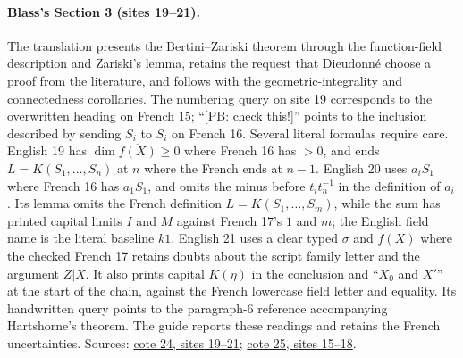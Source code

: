 \documentclass[10pt,a4paper]{article}
\begin{document}
\paragraph{Blass's Section 3 (sites 19--21).}
The translation presents the Bertini--Zariski theorem through the function-field description and Zariski's lemma, retains the request that Dieudonné choose a proof from the literature, and follows with the geometric-integrality and connectedness corollaries. The numbering query on site 19 corresponds to the overwritten heading on French 15; ``[PB: check this!]'' points to the inclusion described by sending $S_i$ to $S_i$ on French 16. Several literal formulas require care. English 19 has $\dim\overline{f(X)}\geq0$ where French 16 has $>0$, and ends $L=K(S_1,\ldots,S_n)$ at $n$ where the French ends at $n-1$. English 20 uses $a_iS_1$ where French 16 has $a_1S_1$, and omits the minus before $t_it_n^{-1}$ in the definition of $a_i$. Its lemma omits the French definition $L=K(S_1,\ldots,S_m)$, while the sum has printed capital limits $I$ and $M$ against French 17's $1$ and $m$; the English field name is the literal baseline $k1$. English 21 uses a clear typed $\sigma$ and $f(X)$ where the checked French 17 retains doubts about the script family letter and the argument $Z|X$. It also prints capital $K(\eta)$ in the conclusion and ``$X_0$ and $X'$'' at the start of the chain, against the French lowercase field letter and equality. Its handwritten query points to the paragraph-6 reference accompanying Hartshorne's theorem. The guide reports these readings and retains the French uncertainties. Sources: \href{https://grothendieck.umontpellier.fr/web/viewer.html?file=../24.pdf\#page=20}{cote 24, sites 19--21}; \href{https://grothendieck.umontpellier.fr/web/viewer.html?file=../25.pdf\#page=16}{cote 25, sites 15--18}.
\end{document}

